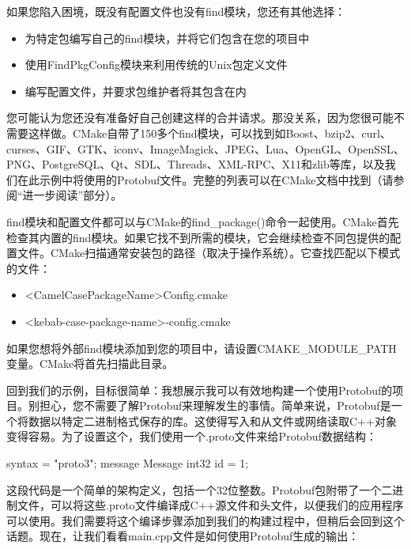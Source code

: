 如果您陷入困境，既没有配置文件也没有find模块，您还有其他选择：

\begin{itemize}
\item
为特定包编写自己的find模块，并将它们包含在您的项目中

\item
使用FindPkgConfig模块来利用传统的Unix包定义文件

\item
编写配置文件，并要求包维护者将其包含在内
\end{itemize}

您可能认为您还没有准备好自己创建这样的合并请求。那没关系，因为您很可能不需要这样做。CMake自带了150多个find模块，可以找到如Boost、bzip2、curl、curses、GIF、GTK、iconv、ImageMagick、JPEG、Lua、OpenGL、OpenSSL、PNG、PostgreSQL、Qt、SDL、Threads、XML-RPC、X11和zlib等库，以及我们在此示例中将使用的Protobuf文件。完整的列表可以在CMake文档中找到（请参阅“进一步阅读”部分）。

find模块和配置文件都可以与CMake的find\_package()命令一起使用。CMake首先检查其内置的find模块。如果它找不到所需的模块，它会继续检查不同包提供的配置文件。CMake扫描通常安装包的路径（取决于操作系统）。它查找匹配以下模式的文件：

\begin{itemize}
\item
<CamelCasePackageName>Config.cmake

\item
<kebab-case-package-name>-config.cmake
\end{itemize}

如果您想将外部find模块添加到您的项目中，请设置CMAKE\_MODULE\_PATH变量。CMake将首先扫描此目录。

回到我们的示例，目标很简单：我想展示我可以有效地构建一个使用Protobuf的项目。别担心，您不需要了解Protobuf来理解发生的事情。简单来说，Protobuf是一个将数据以特定二进制格式保存的库。这使得写入和从文件或网络读取C++对象变得容易。为了设置这个，我们使用一个.proto文件来给Protobuf数据结构：


\begin{shell}
syntax = "proto3";
message Message {
    int32 id = 1;
}
\end{shell}

这段代码是一个简单的架构定义，包括一个32位整数。Protobuf包附带了一个二进制文件，可以将这些.proto文件编译成C++源文件和头文件，以便我们的应用程序可以使用。我们需要将这个编译步骤添加到我们的构建过程中，但稍后会回到这个话题。现在，让我们看看main.cpp文件是如何使用Protobuf生成的输出：

